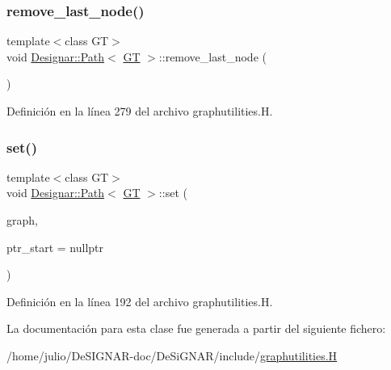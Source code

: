 \subsubsection{\texorpdfstring{remove\+\_\+last\+\_\+node()}{remove\_last\_node()}}
{\footnotesize\ttfamily template$<$class GT$>$ \\
void \hyperlink{class_designar_1_1_path}{Designar\+::\+Path}$<$ \hyperlink{demo-buildgraph_8_c_a3001c40d2c31ca87ed96cd7d1334a55e}{GT} $>$\+::remove\+\_\+last\+\_\+node (\begin{DoxyParamCaption}{ }\end{DoxyParamCaption})\hspace{0.3cm}{\ttfamily [inline]}}



Definición en la línea 279 del archivo graphutilities.\+H.

\mbox{\label{class_designar_1_1_path_a72190e285c2c85aae75b0c8435f1eee9}} 
\subsubsection{\texorpdfstring{set()}{set()}}
{\footnotesize\ttfamily template$<$class GT$>$ \\
void \hyperlink{class_designar_1_1_path}{Designar\+::\+Path}$<$ \hyperlink{demo-buildgraph_8_c_a3001c40d2c31ca87ed96cd7d1334a55e}{GT} $>$\+::set (\begin{DoxyParamCaption}\item[{\hyperlink{demo-buildgraph_8_c_a3001c40d2c31ca87ed96cd7d1334a55e}{GT} \&}]{graph,  }\item[{\hyperlink{class_designar_1_1_path_a7b499fd50e96e3360968d4cfef7a3736}{Node\+Type} $\ast$}]{ptr\+\_\+start = {\ttfamily nullptr} }\end{DoxyParamCaption})\hspace{0.3cm}{\ttfamily [inline]}}



Definición en la línea 192 del archivo graphutilities.\+H.



La documentación para esta clase fue generada a partir del siguiente fichero\+:\begin{DoxyCompactItemize}
\item 
/home/julio/\+De\+S\+I\+G\+N\+A\+R-\/doc/\+De\+Si\+G\+N\+A\+R/include/\hyperlink{graphutilities_8_h}{graphutilities.\+H}\end{DoxyCompactItemize}
